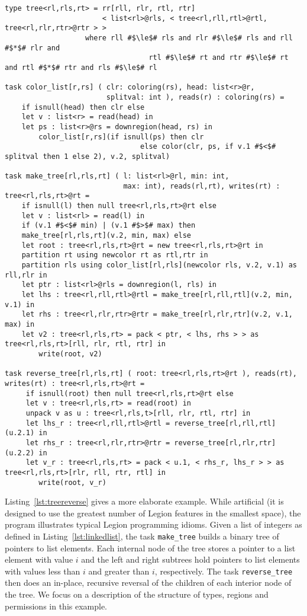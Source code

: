 \begin{lstlisting}[float={t},label={lst:treereverse},caption={Tree Partitioning and Reversal Example}]
type tree<rl,rls,rt> = rr[rll, rlr, rtl, rtr] 
                       < list<rl>@rls, < tree<rl,rll,rtl>@rtl, tree<rl,rlr,rtr>@rtr > >
     		       where rll #$\le$# rls and rlr #$\le$# rls and rll #$*$# rlr and 
                                  rtl #$\le$# rt and rtr #$\le$# rt and rtl #$*$# rtr and rls #$\le$# rl

task color_list[r,rs] ( clr: coloring(rs), head: list<r>@r, 
                        splitval: int ), reads(r) : coloring(rs) =
    if isnull(head) then clr else
    let v : list<r> = read(head) in
    let ps : list<r>@rs = downregion(head, rs) in
        color_list[r,rs](if isnull(ps) then clr 
                                else color(clr, ps, if v.1 #$<$# splitval then 1 else 2), v.2, splitval)

task make_tree[rl,rls,rt] ( l: list<rl>@rl, min: int, 
                            max: int), reads(rl,rt), writes(rt) : tree<rl,rls,rt>@rt =
    if isnull(l) then null tree<rl,rls,rt>@rt else 
    let v : list<rl> = read(l) in
    if (v.1 #$<$# min) | (v.1 #$>$# max) then
    make_tree[rl,rls,rt](v.2, min, max) else
    let root : tree<rl,rls,rt>@rt = new tree<rl,rls,rt>@rt in
    partition rt using newcolor rt as rtl,rtr in
    partition rls using color_list[rl,rls](newcolor rls, v.2, v.1) as rll,rlr in
    let ptr : list<rl>@rls = downregion(l, rls) in
    let lhs : tree<rl,rll,rtl>@rtl = make_tree[rl,rll,rtl](v.2, min, v.1) in
    let rhs : tree<rl,rlr,rtr>@rtr = make_tree[rl,rlr,rtr](v.2, v.1, max) in
    let v2 : tree<rl,rls,rt> = pack < ptr, < lhs, rhs > > as tree<rl,rls,rt>[rll, rlr, rtl, rtr] in
        write(root, v2)

task reverse_tree[rl,rls,rt] ( root: tree<rl,rls,rt>@rt ), reads(rt), writes(rt) : tree<rl,rls,rt>@rt =
     if isnull(root) then null tree<rl,rls,rt>@rt else
     let v : tree<rl,rls,rt> = read(root) in
     unpack v as u : tree<rl,rls,t>[rll, rlr, rtl, rtr] in
     let lhs_r : tree<rl,rll,rtl>@rtl = reverse_tree[rl,rll,rtl](u.2.1) in
     let rhs_r : tree<rl,rlr,rtr>@rtr = reverse_tree[rl,rlr,rtr](u.2.2) in
     let v_r : tree<rl,rls,rt> = pack < u.1, < rhs_r, lhs_r > > as tree<rl,rls,rt>[rlr, rll, rtr, rtl] in
        write(root, v_r)
\end{lstlisting}

Listing~\ref{lst:treereverse} gives a more elaborate example.  While
artificial (it is designed to use the greatest number of Legion
features in the smallest space), the program illustrates typical
Legion programming idioms.  Given a list of integers as defined in Listing~\ref{lst:linkedlist}, 
the task {\tt make\_tree} builds a binary tree of pointers to list elements.
Each internal node of the tree stores a pointer to a list element with value $i$
and the left and right subtrees hold pointers to list elements with values less than $i$ and greater than $i$,
respectively.  The task {\tt reverse\_tree} then does an in-place, recursive reversal of the children of each interior
node of the tree.  We focus on a description of the structure of types, regions and permissions in this example.

